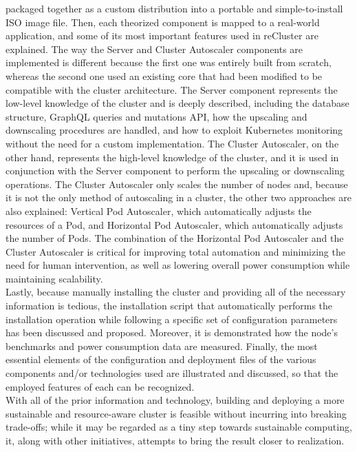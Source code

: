 packaged together as a custom distribution into a portable and simple-to-install
ISO image file. Then, each theorized component is mapped to a real-world
application, and some of its most important features used in reCluster are explained.
The way the Server and Cluster Autoscaler components are implemented is
different because the first one was entirely built from scratch, whereas the second
one used an existing core that had been modified to be compatible with the cluster
architecture. The Server component represents the low-level knowledge of the
cluster and is deeply described, including the database structure, GraphQL
queries and mutations API, how the upscaling and downscaling procedures are handled,
and how to exploit Kubernetes monitoring without the need for a custom
implementation. The Cluster Autoscaler, on the other hand, represents the high-level
knowledge of the cluster, and it is used in conjunction with the Server
component to perform the upscaling or downscaling operations. The Cluster Autoscaler
only scales the number of nodes and, because it is not the only method of
autoscaling in a cluster, the other two approaches are also explained: Vertical
Pod Autoscaler, which automatically adjusts the resources of a Pod, and
Horizontal Pod Autoscaler, which automatically adjusts the number of Pods. The
combination of the Horizontal Pod Autoscaler and the Cluster Autoscaler is
critical for improving total automation and minimizing the need for human
intervention, as well as lowering overall power consumption while maintaining scalability.
\\ %
Lastly, because manually installing the cluster and providing all of the
necessary information is tedious, the installation script that automatically performs
the installation operation while following a specific set of configuration parameters
has been discussed and proposed. Moreover, it is demonstrated how the node's benchmarks
and power consumption data are measured. Finally, the most essential elements of
the configuration and deployment files of the various components and/or technologies
used are illustrated and discussed, so that the employed features of each can be
recognized. \\ %
With all of the prior information and technology, building and deploying a more sustainable
and resource-aware cluster is feasible without incurring into breaking trade-offs;
while it may be regarded as a tiny step towards sustainable computing, it, along
with other initiatives, attempts to bring the result closer to realization.

